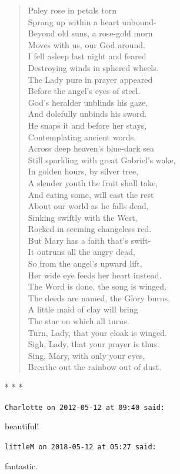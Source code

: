 \begin{verse}
Paley rose in petals torn\\
Sprang up within a heart unbound-\\
Beyond old suns, a rose-gold morn\\
Moves with us, our God around.\\
I fell asleep last night and feared\\
Destroying winds in sphered wheels.\\
The Lady pure in prayer appeared\\
Before the angel's eyes of steel.\\
God's heralder unblinds his gaze,\\
And dolefully unbinds his sword.\\
He snaps it and before her stays,\\
Contemplating ancient words.\\
Across deep heaven's blue-dark sea\\
Still sparkling with great Gabriel's wake,\\
In golden hours, by silver tree,\\
A slender youth the fruit shall take,\\
And eating some, will cast the rest\\
About our world as he falls dead,\\
Sinking swiftly with the West,\\
Rocked in seeming changeless red.\\
But Mary has a faith that's swift-\\
It outruns all the angry dead,\\
So from the angel's upward lift,\\
Her wide eye feeds her heart instead.\\
The Word is done, the song is winged,\\
The deeds are named, the Glory burns,\\
A little maid of clay will bring\\
The star on which all turns.\\
Turn, Lady, that your cloak is winged.\\
Sigh, Lady, that your prayer is thus.\\
Sing, Mary, with only your eyes,\\
Breathe out the rainbow out of dust.
\end{verse}


\begin{center}* * *\end{center}

\begin{footnotesize}
\begin{sffamily}
\texttt{Charlotte on 2012-05-12 at 09:40 said:}

beautiful!

\hfill

\texttt{littleM on 2018-05-12 at 05:27 said:}

fantastic.

\end{sffamily}
\end{footnotesize}


